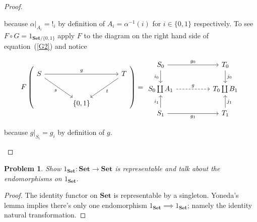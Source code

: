 \documentclass[11pt]{amsart}
\theoremstyle{plain}
\newtheorem{prob}[thm]{Problem}
\theoremstyle{definition}
\newcommand{\Set}{{\mathbf{Set}}}
\newcommand{\noi}{{\noindent}}
\begin{document}
\begin{proof}
\begin{enumerate}
\noi because $\alpha|_{A_i} = !_i$ by definition of $A_i = \alpha^{-1}(i)$ for $i \in \{0,1\}$ respectively. To see $F \circ G = 1_{\Set/\{0,1\}}$ apply $F$ to the diagram on the right hand side of equation~(\ref{G2}) and notice 


\[ F \left(\begin{tikzcd}[column sep = large, row sep = large]
    S \ar[dr, "s"']\rar[rr,"g"] && T \ar[dl, "t"] \\
    & \{ 0 , 1 \} & 
    \end{tikzcd}\right) = 
    \begin{tikzcd}[column sep = huge]
    S_0 \dar["i_0"'] \rar["g_0"] & T_0 \dar["j_0"]\\ 
    S_0 \coprod A_1 \rar[dashed, "g"]  & T_0 \coprod B_1\\
    S_1 \uar["i_1"] \rar["g_1"'] & T_1 \uar["j_1"'] 
    \end{tikzcd}
    \]

\noi because $g|_{S_i} = g_i$ by definition of $g$. 
\end{enumerate}
\end{proof}

\begin{prob}
Show $1_\Set : \Set \to \Set$ is representable and talk about the endomorphisms on $1_\Set$. 
\end{prob}
\begin{proof}
The identity functor on $\Set$ is representable by a singleton. Yoneda's lemma implies there's only one endomorphism $1_\Set \implies 1_\Set$; namely the identity natural transformation. 
\end{proof}
\end{document}
